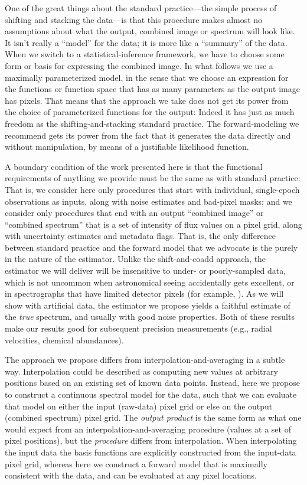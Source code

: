 \documentclass[modern]{aastex631}
\begin{document}
One of the great things about the standard practice---the simple process of shifting and stacking the data---is that this procedure makes almost no assumptions about what the output, combined image or spectrum will look like.
It isn't really a ``model'' for the data; it is more like a ``summary'' of the data.
When we switch to a statistical-inference framework, we have to choose some form or basis for expressing the combined image.
In what follows we use a maximally parameterized model, in the sense that we choose an expression for the functions or function space that has as many parameters as the output image has pixels.
That means that the approach we take does not get its power from the choice of parameterized functions for the output:
Indeed it has just as much freedom as the shifting-and-stacking standard practice.
The forward-modeling we recommend gets its power from the fact that it generates the data directly and without manipulation, by means of a justifiable likelihood function.

A boundary condition of the work presented here is that the functional requirements of anything we provide must be the same as with standard practice:
That is, we consider here only procedures that start with individual, single-epoch observations as inputs, along with noise estimates and bad-pixel masks; and we consider only procedures that end with an output ``combined image'' or ``combined spectrum'' that is a set of intensity of flux values on a pixel grid, along with uncertainty estimates and metadata flags.
That is, the only difference between standard practice and the forward model that we advocate is the purely in the nature of the estimator.
Unlike the shift-and-coadd approach, the estimator we will deliver will be insensitive to under- or poorly-sampled data, which is not uncommon when astronomical seeing accidentally gets excellent, or in spectrographs that have limited detector pixels (for example, \citealt{apogeehardware}).
As we will show with artificial data, the estimator we propose yields a faithful estimate of the \emph{true} spectrum, and usually with good noise properties.
Both of these results make our results good for subsequent precision measurements (e.g., radial velocities, chemical abundances).

The approach we propose differs from interpolation-and-averaging in a subtle way. 
Interpolation could be described as computing new values at arbitrary positions based on an existing set of known data points. 
Instead, here we propose to construct a continuous spectral model for the data, such that we can evaluate that model on either the input (raw-data) pixel grid or else on the output (combined spectrum) pixel grid.
The \emph{output product} is the same form as what one would expect from an interpolation-and-averaging procedure (values at a set of pixel positions), but the \emph{procedure} differs from interpolation. When interpolating the input data the basis functions are explicitly constructed from the input-data pixel grid, whereas here we construct a forward model that is maximally consistent with the data, and can be evaluated at any pixel locations.
\end{document}
